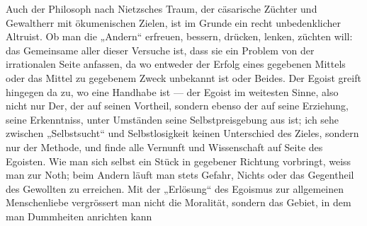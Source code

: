 Auch der Philosoph nach Nietzsches Traum, der cäsarische Züchter und Gewaltherr mit ökumenischen Zielen, ist im Grunde ein recht unbedenklicher Altruist. Ob man die „Andern“ erfreuen, bessern, drücken, lenken, züchten will: das Gemeinsame aller dieser Versuche ist, dass sie ein Problem von der irrationalen Seite anfassen, da wo entweder der Erfolg eines gegebenen Mittels oder das Mittel zu gegebenem Zweck unbekannt ist oder Beides. Der Egoist greift hingegen da zu, wo eine Handhabe ist — der Egoist im weitesten Sinne, also nicht nur Der, der auf seinen Vortheil, sondern ebenso der auf seine Erziehung, seine Erkenntniss, unter Umständen seine Selbstpreisgebung aus ist; ich sehe zwischen „Selbstsucht“ und Selbstlosigkeit keinen Unterschied des Zieles, sondern nur der Methode, und finde alle Vernunft und Wissenschaft auf Seite des Egoisten. Wie man sich selbst ein Stück in gegebener Richtung vorbringt, weiss man zur Noth; beim Andern läuft man stets Gefahr, Nichts oder das Gegentheil des Gewollten zu erreichen. Mit der „Erlösung“ des Egoismus zur allgemeinen Menschenliebe vergrössert man nicht die Moralität, sondern das Gebiet, in dem man Dummheiten anrichten kann
\par

